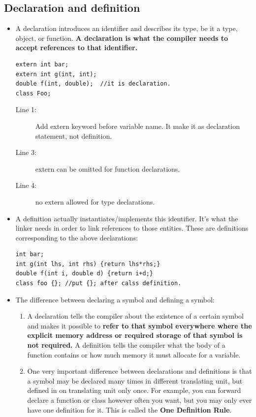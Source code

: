 \documentclass[a4paper,11pt,twoside]{book}
\begin{document}
\subsection{Declaration and definition}
\begin{itemize}
	\item A declaration introduces an identifier and describes its type, be it a type, object, or function. \textbf{A declaration is what the compiler needs to accept references to that identifier.} 
	
\begin{lstlisting}
extern int bar;
extern int g(int, int);
double f(int, double);  //it is declaration.
class Foo; 
\end{lstlisting}
\begin{description}
	\item[Line 1:] Add extern keyword before variable name. It make it as declaration statement, not definition.
	
	\item[Line 3:] extern can be omitted for function declarations.
	
	\item[Line 4:] no extern allowed for type declarations.
\end{description}
	
	\item A definition actually instantiates/implements this identifier. It's what the linker needs in order to link references to those entities. These are definitions corresponding to the above declarations:

\begin{lstlisting}[numbers=none]
int bar;
int g(int lhs, int rhs) {return lhs*rhs;}
double f(int i, double d) {return i+d;}
class foo {}; //put {}; after calss definition.
\end{lstlisting}
	
	\item The difference between declaring a symbol and defining a symbol:
	\begin{enumerate}
		\item A declaration tells the compiler about the existence of a certain symbol and makes it possible to \textbf{refer to that symbol everywhere where the explicit memory address or required storage of that symbol is not required.}  A definition tells the compiler what the body of a function contains or how much memory it must allocate for a variable.
		
		\item One very important difference between declarations and definitions is that a symbol may be declared many times in different translating unit, but defined in on translating unit only once. For example, you can forward declare a function or class however often you want, but you may only ever have one definition for it. This is called the \textbf{One Definition Rule}.
	\end{enumerate}
	
	

\end{itemize}
\end{document}
